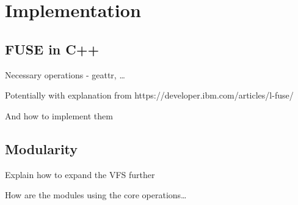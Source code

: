 \chapter{Implementation}
\label{chap:implementation}

\section{FUSE in C++}\label{sec:fuse-in-c++}

Necessary operations - geattr, \ldots

Potentially with explanation from https://developer.ibm.com/articles/l-fuse/

And how to implement them

\section{Modularity}\label{sec:modularity}

Explain how to expand the VFS further

How are the modules using the core operations\ldots